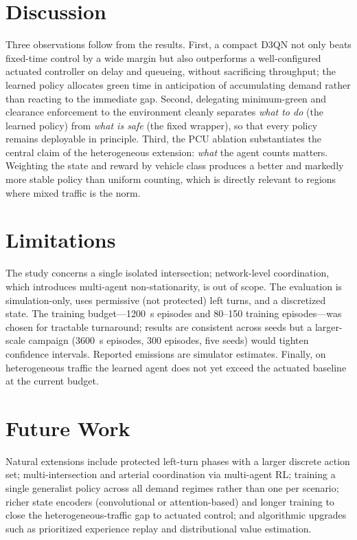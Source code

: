 \documentclass[conference]{IEEEtran}
\begin{document}
\section{Discussion}
\label{sec:discuss}
Three observations follow from the results. First, a compact D3QN not only beats
fixed-time control by a wide margin but also outperforms a well-configured
actuated controller on delay and queueing, without sacrificing throughput; the
learned policy allocates green time in anticipation of accumulating demand rather
than reacting to the immediate gap. Second, delegating minimum-green and
clearance enforcement to the environment cleanly separates \emph{what to do}
(the learned policy) from \emph{what is safe} (the fixed wrapper), so that every
policy remains deployable in principle. Third, the PCU ablation substantiates the
central claim of the heterogeneous extension: \emph{what} the agent counts
matters. Weighting the state and reward by vehicle class produces a better and
markedly more stable policy than uniform counting, which is directly relevant to
regions where mixed traffic is the norm.

\section{Limitations}
\label{sec:limit}
The study concerns a single isolated intersection; network-level coordination,
which introduces multi-agent non-stationarity, is out of scope. The evaluation is
simulation-only, uses permissive (not protected) left turns, and a discretized
state. The training budget---1200~s episodes and 80--150 training
episodes---was chosen for tractable turnaround; results are consistent across
seeds but a larger-scale campaign (3600~s episodes, 300 episodes, five seeds)
would tighten confidence intervals. Reported emissions are simulator estimates.
Finally, on heterogeneous traffic the learned agent does not yet exceed the
actuated baseline at the current budget.

\section{Future Work}
\label{sec:future}
Natural extensions include protected left-turn phases with a larger discrete
action set; multi-intersection and arterial coordination via multi-agent RL;
training a single generalist policy across all demand regimes rather than one per
scenario; richer state encoders (convolutional or attention-based) and longer
training to close the heterogeneous-traffic gap to actuated control; and
algorithmic upgrades such as prioritized experience replay and distributional
value estimation.
\end{document}
